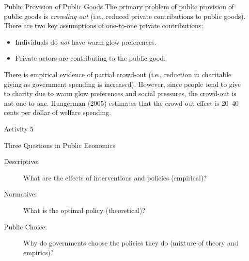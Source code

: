 \documentclass[8pt]{extarticle}
\begin{document}
  \begin{problem}{Public Provision of Public Goods}
    The primary problem of public provision of public goods is \textit{crowding out} (i.e., reduced private contributions to public goods). There are two key assumptions of one-to-one private contributions:
    \begin{itemize}
      \item Individuals do \textit{not} have warm glow preferences.
      \item Private actors are contributing to the public good.
    \end{itemize}
    There is empirical evidence of partial crowd-out (i.e., reduction in charitable giving as government spending is increased). However, since people tend to give to charity due to warm glow preferences and social pressures, the crowd-out is not one-to-one. Hungerman (2005) estimates that the crowd-out effect is 20–40 cents per dollar of welfare spending.
  \end{problem}
  \begin{problem}{Activity 5}
    \begin{tcbraster}[raster columns = 1,colframe = black!75!white,colback=white]
    \end{tcbraster}
  \end{problem}
  \begin{problem}{Three Questions in Public Economics}
    \begin{description}
      \item[Descriptive:] What are the effects of interventions and policies (empirical)?
      \item[Normative:] What is the optimal policy (theoretical)?
      \item[Public Choice:] Why do governments choose the policies they do (mixture of theory and empirics)?
    \end{description}
  \end{problem}
\end{document}
